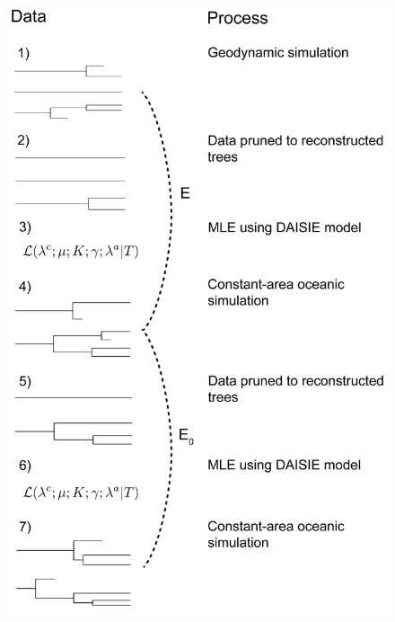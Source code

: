 \documentclass{article}
\begin{document}
\clearpage

\begin{figure}
    \centering
    \includegraphics{JBI-21-0508_Fig2.png}

\end{figure}
\end{document}
